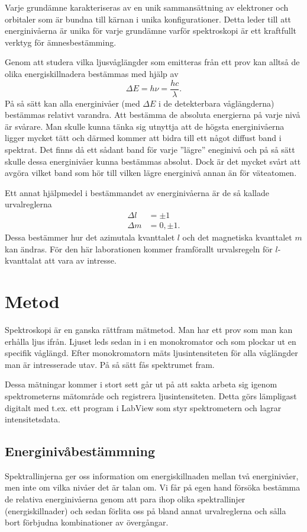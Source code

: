 \documentclass[11pt,a4paper]{article}
\begin{document}
Varje grundämne karakteriseras av en unik sammansättning av
elektroner och orbitaler som är bundna till kärnan i unika
konfigurationer. Detta leder till att energinivåerna är unika för
varje grundämne varför spektroskopi är ett kraftfullt verktyg för
ämnesbestämming. 
 
Genom att studera vilka ljusvåglängder som emitteras från ett prov
kan alltså de olika energiskillnadera bestämmas med hjälp av  
\[\Delta E = h\nu=\frac{hc}{\lambda}.\]
På så sätt kan alla energinivåer (med $\Delta E$ i de detekterbara
våglängderna) bestämmas relativt varandra. Att bestämma de absoluta
energierna på varje nivå är svårare. Man skulle kunna tänka sig
utnyttja att de högsta energinivåerna ligger mycket tätt och därmed
kommer att bidra till ett något diffust band i spektrat. Det finns då
ett sådant band för varje ''lägre'' eneginivå och på så sätt skulle
dessa energinivåer kunna bestämmas absolut. Dock är det mycket svårt
att avgöra vilket band som hör till vilken lägre energinivå annan än
för väteatomen. 
 
Ett annat hjälpmedel i bestämmandet av energinivåerna är de så
kallade urvalreglerna 
\begin{equation*}
\begin{aligned}
\Delta l &= \pm 1\\
\Delta m &= 0, \pm 1.
\end{aligned}
\end{equation*}
Dessa bestämmer hur det azimutala kvanttalet $l$ och det magnetiska
kvanttalet $m$ kan ändras. För den här laborationen kommer
framförallt urvalsregeln för $l$-kvanttalat att vara av intresse. 


\section{Metod}
%

Spektroskopi är en ganska rättfram mätmetod. Man har ett prov som man
kan erhålla ljus ifrån. Ljuset leds sedan in i en monokromator och som
plockar ut en specifik våglängd. Efter monokromatorn mäts
ljusintensiteten för alla våglängder man är intresserade utav. På så
sätt fås spektrumet fram.

Dessa mätningar kommer i stort sett går ut på att sakta arbeta sig
igenom spektrometerns mätområde och registrera ljusintensiteten. Detta
görs lämpligast digitalt med t.ex. ett program i LabView som styr
spektrometern och lagrar intensitetsdata. 


\subsection{Energinivåbestämmning}
Spektrallinjerna ger oss information om energiskillnaden mellan två
energinivåer, men inte om vilka nivåer det är talan om. Vi får på egen
hand försöka bestämma de relativa energinivåerna genom att para ihop
olika spektrallinjer (energiskillnader) och sedan förlita oss på bland
annat urvalreglerna och sålla bort förbjudna kombinationer av
övergångar.
\end{document}
